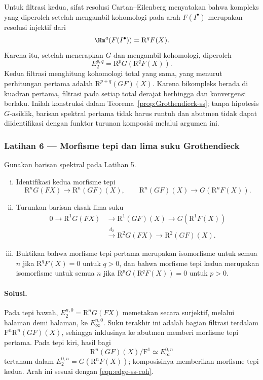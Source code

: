 Untuk filtrasi kedua, sifat resolusi Cartan--Eilenberg menyatakan bahwa
kompleks yang diperoleh setelah mengambil kohomologi pada arah
$F(I^\bullet)$ merupakan resolusi injektif dari
\[
	\Hm^q(F(I^\bullet))=\mathrm{R}^qF(X).
\]
Karena itu, setelah menerapkan $G$ dan mengambil kohomologi, diperoleh
\[
	E_2^{p,q}=\mathrm{R}^pG(\mathrm{R}^qF(X)).
\]
Kedua filtrasi menghitung kohomologi total yang sama, yang menurut perhitungan
pertama adalah $\mathrm{R}^{p+q}(GF)(X)$. Karena bikompleks berada di kuadran
pertama, filtrasi pada setiap total derajat berhingga dan konvergensi berlaku.
Inilah konstruksi dalam Teorema~\ref{prop:Grothendieck-ss}; tanpa hipotesis
$G$-asiklik, barisan spektral pertama tidak harus runtuh dan abutmen tidak
dapat diidentifikasi dengan funktor turunan komposisi melalui argumen ini.

\subsubsection*{Latihan 6 --- Morfisme tepi dan lima suku Grothendieck}
\hypertarget{o014.mastery.derived-spectral.002.ex06}{ }
\label{mastery:derived-spectral-002-ex06}

Gunakan barisan spektral pada Latihan 5.
\begin{enumerate}[(i)]
	\item Identifikasi kedua morfisme tepi
	\[
		\mathrm{R}^nG(FX)\longrightarrow\mathrm{R}^n(GF)(X),
		\qquad
		\mathrm{R}^n(GF)(X)\longrightarrow G(\mathrm{R}^nF(X)).
	\]
	\item Turunkan barisan eksak lima suku
	\[
	\begin{aligned}
		0\to\mathrm{R}^1G(FX)&\to\mathrm{R}^1(GF)(X)
		\to G(\mathrm{R}^1F(X))\\
		&\xrightarrow{d_2}\mathrm{R}^2G(FX)
		\to\mathrm{R}^2(GF)(X).
	\end{aligned}
	\]
	\item Buktikan bahwa morfisme tepi pertama merupakan isomorfisme untuk
	semua $n$ jika $\mathrm{R}^qF(X)=0$ untuk $q>0$, dan bahwa morfisme tepi
	kedua merupakan isomorfisme untuk semua $n$ jika
	$\mathrm{R}^pG(\mathrm{R}^qF(X))=0$ untuk $p>0$.
\end{enumerate}

\paragraph{Solusi.}
\hypertarget{o014.mastery.derived-spectral.002.sol06}{ }
Pada tepi bawah,
$E_2^{n,0}=\mathrm{R}^nG(FX)$ memetakan secara surjektif, melalui halaman
demi halaman, ke $E_\infty^{n,0}$. Suku terakhir ini adalah bagian
filtrasi terdalam $\mathrm{F}^n\mathrm{R}^n(GF)(X)$, sehingga inklusinya ke
abutmen memberi morfisme tepi pertama. Pada tepi kiri, hasil bagi
\[
	\mathrm{R}^n(GF)(X)/\mathrm{F}^1
	\simeq E_\infty^{0,n}
\]
tertanam dalam $E_2^{0,n}=G(\mathrm{R}^nF(X))$; komposisinya memberikan
morfisme tepi kedua. Arah ini sesuai dengan
\eqref{eqn:edge-ss-coh}.

